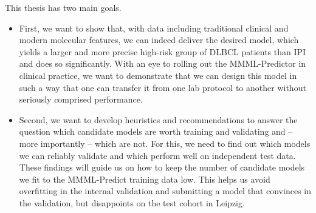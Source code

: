 This thesis has two main goals.
\begin{itemize}
\item First, we want to show that, with data including traditional clinical and modern 
molecular features, we can indeed deliver 
the desired model, which yields a larger and more precise high-risk group of DLBCL patients than 
IPI and does so significantly. With an eye to rolling out the MMML-Predictor in clinical practice, 
we want to demonstrate that we can design this model in such a way that one can transfer it from 
one lab protocol to another without seriously comprised performance.
\item Second, we want to develop heuristics and recommendations to answer the question which candidate 
models are worth training and validating and -- more importantly -- which are not. For this, we 
need to find out which models we can reliably validate 
and which perform well on independent test data. These findings will guide us on how to keep 
the number of candidate models we fit to the MMML-Predict training data low. This helps
us avoid overfitting in the internal validation and submitting a model that convinces 
in the validation, but disappoints on the test cohort in Leipzig.
\end{itemize}